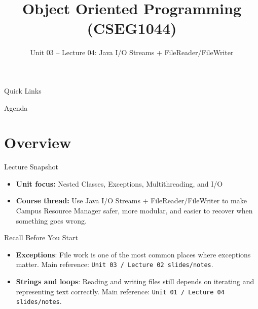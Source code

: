\documentclass{beamer}
\title[OOPS with Java]{Object Oriented Programming (CSEG1044)}
\subtitle{Unit 03 -- Lecture 04: Java I/O Streams + FileReader/FileWriter}
\begin{document}
\begin{frame}[fragile]
  \titlepage
  \vspace{0.5em}
  \slidesources{\OOPSUnitIIISources}
\end{frame}

\begin{frame}{Quick Links}
  \centering
  \hyperlink{sec:overview}{}\hspace{0.6em}
  \hyperlink{sec:concepts}{}\hspace{0.6em}
  \hyperlink{sec:demo}{}\hspace{0.6em}
  \hyperlink{sec:summary}{}
  \slidesources{\OOPSUnitIIISources}
\end{frame}

\begin{frame}{Agenda}
  \tableofcontents
  \slidesources{\OOPSUnitIIISources}
\end{frame}

\section{Overview}
\label{sec:overview}

\begin{frame}{Lecture Snapshot}
\begin{itemize}[<+->]
  \item \textbf{Unit focus:} Nested Classes, Exceptions, Multithreading, and I/O
  \item \textbf{Course thread:} Use Java I/O Streams + FileReader/FileWriter to make Campus Resource Manager safer, more modular, and easier to recover when something goes wrong.
\end{itemize}
  \slidesources{\OOPSUnitIIISources}
\end{frame}

\begin{frame}{Recall Before You Start}
\begin{itemize}[<+->]
  \item \textbf{Exceptions}: File work is one of the most common places where exceptions matter. Main reference: \texttt{Unit 03 / Lecture 02 slides/notes}.
  \item \textbf{Strings and loops}: Reading and writing files still depends on iterating and representing text correctly. Main reference: \texttt{Unit 01 / Lecture 04 slides/notes}.
\end{itemize}
  \slidesources{\OOPSUnitIIISources}
\end{frame}
\end{document}
